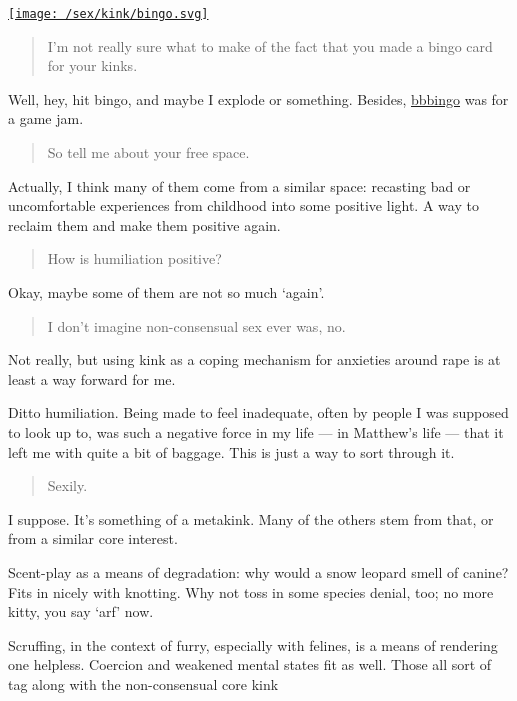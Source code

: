 \href{https://bbbingo.me/preparations-squadrons-voices-spans}{\texttt{[image: /sex/kink/bingo.svg]}}

\begin{quote}
I'm not really sure what to make of the fact that you made a bingo card for your kinks.
\end{quote}

Well, hey, hit bingo, and maybe I explode or something. Besides, \href{https://bbbingo.me}{bbbingo} was for a game jam.

\begin{quote}
So tell me about your free space.
\end{quote}

Actually, I think many of them come from a similar space: recasting bad or uncomfortable experiences from childhood into some positive light. A way to reclaim them and make them positive again.

\begin{quote}
How is humiliation positive?
\end{quote}

Okay, maybe some of them are not so much `again'.

\begin{quote}
I don't imagine non-consensual sex ever was, no.
\end{quote}

Not really, but using kink as a coping mechanism for anxieties around rape is at least a way forward for me.

Ditto humiliation. Being made to feel inadequate, often by people I was supposed to look up to, was such a negative force in my life --- in Matthew's life --- that it left me with quite a bit of baggage. This is just a way to sort through it.

\begin{quote}
Sexily.
\end{quote}

I suppose. It's something of a metakink. Many of the others stem from that, or from a similar core interest.

Scent-play as a means of degradation: why would a snow leopard smell of canine? Fits in nicely with knotting. Why not toss in some species denial, too; no more kitty, you say `arf' now.

Scruffing, in the context of furry, especially with felines, is a means of rendering one helpless. Coercion and weakened mental states fit as well. Those all sort of tag along with the non-consensual core kink

